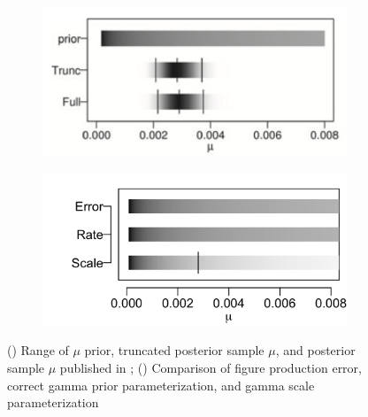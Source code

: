 \documentclass{uwstat572}
\begin{document}
\begin{figure}[H]
	\centering
	\begin{subfigure}[b]{0.49\textwidth}
		\includegraphics[width=\textwidth]{figures/brown_figure_2a.png}
		\caption{}
		\label{fig:brown2a}
	\end{subfigure}
	\hfill
	\begin{subfigure}[b]{0.49\textwidth}
		\includegraphics[width=\textwidth]{figures/rate_v_scale_plot.png}
		\caption{}
		\label{fig:welch2a}
	\end{subfigure}
	\caption{() Range of $\mu$ prior, truncated posterior sample $\mu$, and posterior sample $\mu$ published in \citet{Brown}; () Comparison of figure production error, correct gamma prior parameterization, and gamma scale parameterization }
	\label{fig:figError}
\end{figure} 
\end{document}
